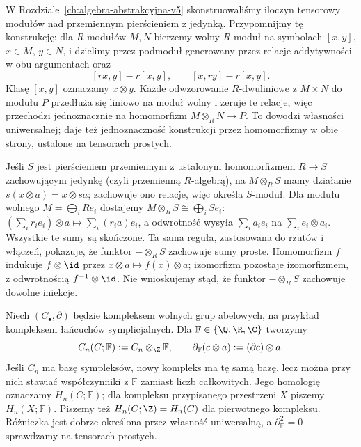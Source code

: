 \begin{uwaga}
\label{uwaga:tensor-modulow}
W Rozdziale~\ref{ch:algebra-abstrakcyjna-v5}
skonstruowaliśmy iloczyn tensorowy modułów nad przemiennym
pierścieniem z jedynką. Przypomnijmy tę konstrukcję:
dla $R$-modułów $M,N$ bierzemy wolny
$R$-moduł na symbolach $[x,y]$, $x\in M$, $y\in N$, i dzielimy
przez podmoduł generowany przez relacje addytywności w obu argumentach
oraz
\[
 [rx,y]-r[x,y],\qquad [x,ry]-r[x,y].
\]
Klasę $[x,y]$ oznaczamy $x\otimes y$. Każde odwzorowanie
$R$-dwuliniowe z $M\times N$ do modułu $P$ przedłuża się liniowo
na moduł wolny i zeruje te relacje, więc przechodzi jednoznacznie
na homomorfizm $M\otimes_R N\to P$. To dowodzi własności uniwersalnej;
daje też jednoznaczność konstrukcji przez homomorfizmy w obie strony,
ustalone na tensorach prostych.

Jeśli $S$ jest pierścieniem przemiennym z ustalonym homomorfizmem
$R\to S$ zachowującym jedynkę (czyli przemienną $R$-algebrą),
na $M\otimes_R S$ mamy
działanie $s(x\otimes a)=x\otimes sa$; zachowuje ono relacje,
więc określa $S$-moduł. Dla modułu wolnego
$M=\bigoplus_i Re_i$ dostajemy
$M\otimes_R S\cong\bigoplus_i Se_i$:
$ (\sum_i r_i e_i)\otimes a\mapsto\sum_i(r_i a)e_i$,
a odwrotność wysyła $\sum_i a_i e_i$ na $\sum_i e_i\otimes a_i$.
Wszystkie te sumy są skończone.
Ta sama reguła, zastosowana do rzutów i włączeń, pokazuje,
że funktor $-\otimes_R S$ zachowuje sumy proste. Homomorfizm $f$ indukuje
$f\otimes\id$ przez $x\otimes a\mapsto f(x)\otimes a$;
izomorfizm pozostaje izomorfizmem, z odwrotnością
$f^{-1}\otimes\id$. Nie wnioskujemy stąd, że funktor
$-\otimes_R S$ zachowuje dowolne iniekcje.
\end{uwaga}

\begin{definicja}
\label{def:homologia-ciala-char-zero}
Niech $(C_\bullet,\partial)$ będzie kompleksem
wolnych grup abelowych, na przykład
kompleksem łańcuchów symplicjalnych.
Dla $\mathbb F\in\{\Q,\R,\C\}$ tworzymy
\[
 C_n(C;\mathbb F):=C_n\otimes_{\Z}\mathbb F,
 \qquad
 \partial_{\mathbb F}(c\otimes a)
       :=(\partial c)\otimes a.
\]
Jeśli $C_n$ ma bazę sympleksów, nowy kompleks
ma tę samą bazę, lecz można przy nich stawiać
współczynniki z $\mathbb F$ zamiast liczb całkowitych.
Jego homologię oznaczamy $H_n(C;\mathbb F)$;
dla kompleksu przypisanego przestrzeni $X$
piszemy $H_n(X;\mathbb F)$.
Piszemy też $H_n(C;\Z)=H_n(C)$ dla pierwotnego kompleksu.
Różniczka jest dobrze określona przez własność uniwersalną,
a $\partial_{\mathbb F}^2=0$ sprawdzamy na tensorach prostych.
\end{definicja}

